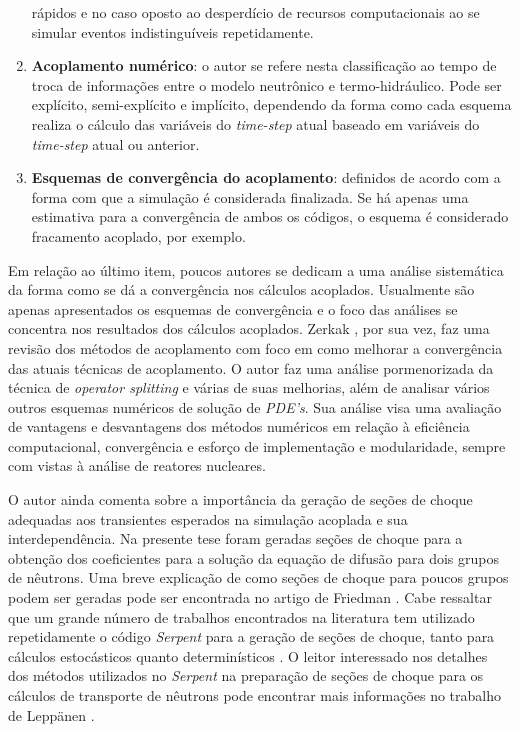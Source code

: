 \begin{enumerate}
rápidos e no caso oposto ao desperdício de recursos computacionais ao se simular eventos indistinguíveis repetidamente.
\item \textbf{Acoplamento numérico}: o autor se refere nesta classificação ao tempo de troca de informações entre o modelo 
neutrônico e termo-hidráulico. Pode ser explícito, semi-explícito e implícito, dependendo da forma como cada esquema 
realiza o cálculo das variáveis do \textit{time-step} atual baseado em variáveis do \textit{time-step} atual ou 
anterior.
\item \textbf{Esquemas de convergência do acoplamento}: definidos de acordo com a forma com que a simulação é considerada 
finalizada. Se há apenas uma estimativa para a convergência de ambos os códigos, o esquema é considerado fracamento 
acoplado, por exemplo.  
\end{enumerate}

Em relação ao último item, poucos autores se dedicam a uma análise sistemática da forma como se
dá a convergência nos cálculos acoplados. Usualmente são apenas apresentados os esquemas
de convergência e o foco das análises se concentra nos resultados dos cálculos acoplados.
Zerkak \cite{Zerkak2015}, por sua vez, faz uma revisão dos métodos de acoplamento com
foco em como melhorar a convergência das atuais técnicas de acoplamento. O autor faz uma
análise pormenorizada da técnica de \textit{operator splitting} e várias de suas melhorias,
além de analisar vários outros esquemas numéricos de solução de \textit{PDE's}. Sua análise visa
uma avaliação de vantagens e desvantagens dos métodos numéricos em relação à eficiência
computacional, convergência e esforço de implementação e modularidade, sempre com vistas
à análise de reatores nucleares.

O autor ainda comenta sobre a importância da geração de seções de choque adequadas aos transientes esperados na 
simulação acoplada e sua interdependência. Na presente tese foram geradas seções de choque para a obtenção dos
coeficientes para a solução da equação de difusão para dois grupos de nêutrons.
Uma breve explicação de como seções de choque para poucos grupos podem ser geradas pode ser encontrada no
artigo de Friedman \cite{Friedman2013}. Cabe ressaltar que um grande número de trabalhos encontrados
na literatura tem utilizado repetidamente o código \textit{Serpent} \cite{Serpent2013} para
a geração de seções de choque, tanto para cálculos estocásticos quanto determinísticos \cite{Jareteg2014}. O leitor interessado nos detalhes dos métodos utilizados no \textit{Serpent} na
preparação de seções de choque para os cálculos de transporte de nêutrons pode encontrar mais informações no trabalho de Leppänen \cite{Leppanen2009}.

